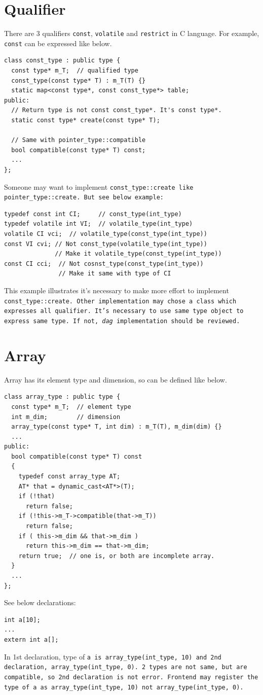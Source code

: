 \section{Qualifier}
\label{type_e002}
There are 3 qualifiers {\tt{const}}, {\tt{volatile}} and {\tt{restrict}}
in C language.
For example, {\tt{const}} can be expressed like below.
\begin{verbatim}
class const_type : public type {
  const type* m_T;  // qualified type
  const_type(const type* T) : m_T(T) {}
  static map<const type*, const const_type*> table;
public:
  // Return type is not const const_type*. It's const type*.
  static const type* create(const type* T);

  // Same with pointer_type::compatible
  bool compatible(const type* T) const;
  ...
};
\end{verbatim}
Someone may want to implement \tt{const\_type::create}
like {\tt{pointer\_type::create}}. But see below example:
\begin{verbatim}
typedef const int CI;     // const_type(int_type)
typedef volatile int VI;  // volatile_type(int_type)
volatile CI vci;  // volatile_type(const_type(int_type))
const VI cvi; // Not const_type(volatile_type(int_type))
              // Make it volatile_type(const_type(int_type))
const CI cci;  // Not cosnst_type(const_type(int_type))
               // Make it same with type of CI
\end{verbatim}
This example illustrates it's necessary to make more effort
to implement \tt{const\_type::create}. Other implementation
may chose a class which expresses all qualifier. It's necessary
to use same type object to express same type. If not,
{\it dag} implementation should be reviewed.

\section{Array}

Array has its element type and dimension, so can be defined like below.

\begin{verbatim}
class array_type : public type {
  const type* m_T;  // element type
  int m_dim;        // dimension
  array_type(const type* T, int dim) : m_T(T), m_dim(dim) {}
  ...
public:
  bool compatible(const type* T) const
  {
    typedef const array_type AT;
    AT* that = dynamic_cast<AT*>(T);
    if (!that)
      return false;
    if (!this->m_T->compatible(that->m_T))
      return false;
    if ( this->m_dim && that->m_dim )
      return this->m_dim == that->m_dim;
    return true;  // one is, or both are incomplete array.
  }
  ...
};
\end{verbatim}
See below declarations:
\begin{verbatim}
int a[10];
...
extern int a[];
\end{verbatim}
In 1st declaration, type of \tt{a} is
\tt{array\_type(int\_type, 10)} and 2nd declaration,
\tt{array\_type(int\_type, 0)}. 2 types are not
same, but are compatible, so 2nd declaration is
not error. Frontend may register the type of \tt{a}
as \tt{array\_type(int\_type, 10)} not
\tt{array\_type(int\_type, 0)}.

